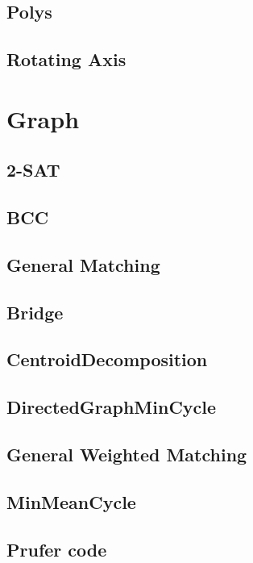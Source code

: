 \subsection{Polys}

\subsection{Rotating Axis}




\section{Graph}
\subsection{2-SAT}

\subsection{BCC}

\subsection{General Matching}

\subsection{Bridge}

\subsection{CentroidDecomposition}

\subsection{DirectedGraphMinCycle}

\subsection{General Weighted Matching}

\subsection{MinMeanCycle}

\subsection{Prufer code}

%
